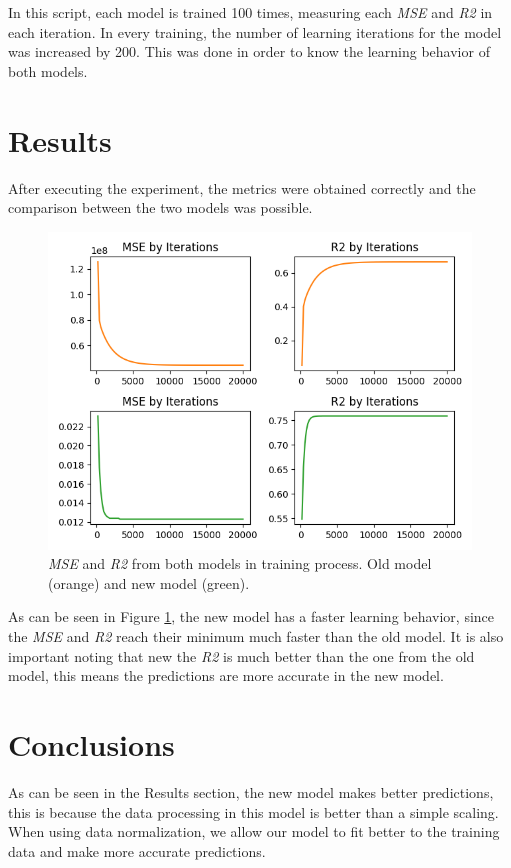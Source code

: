 \documentclass[11pt]{article}
\begin{document}
    In this script, each model is trained 100 times, measuring each \textit{MSE} and \textit{R2} in each iteration. In
    every training, the number of learning iterations for the model was increased by 200. This was done in order to
    know the learning behavior of both models.

\section{Results}\label{sec:results}
    After executing the experiment, the metrics were obtained correctly and the comparison between the two models was
    possible.
    \begin{figure}[h]
        \includegraphics{figures}
        \caption{
            \textit{MSE} and \textit{R2} from both models in training process. Old model (orange) and new model (green).
        }
        \label{fig:results}
    \end{figure}

    As can be seen in Figure \ref{fig:results}, the new model has a faster learning behavior, since the \textit{MSE} and
    \textit{R2} reach their minimum much faster than the old model. It is also important noting that new the \textit{R2}
    is much better than the one from the old model, this means the predictions are more accurate in the new model.

\section{Conclusions}
    As can be seen in the Results section, the new model makes better predictions, this is because the data processing
    in this model is better than a simple scaling. When using data normalization, we allow our model to fit better to
    the training data and make more accurate predictions.
\end{document}
